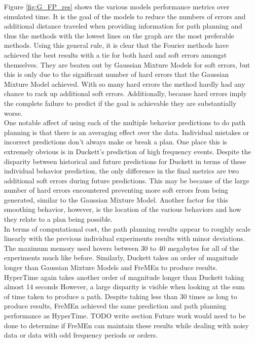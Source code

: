 Figure \ref{fig:G_FP_res} shows the various models performance metrics over
simulated time. It is the goal of the models to reduce the numbers of errors
and additional distance traveled when providing information for path planning
and thus the methods with the lowest lines on the graph are the most
preferable methods. Using this general rule, it is clear that the Fourier
methods have achieved the best results with a tie for both hard and soft errors
amongst themselves. They are beaten out by Gaussian Mixture Models for soft
errors, but this is only due to the significant number of hard errors that
the Gaussian Mixture Model achieved. With so many hard errors the method hardly
had any chance to rack up additional soft errors. Additionally, because hard
errors imply the complete failure to predict if the goal is achievable they
are substantially worse. \\

One notable affect of using each of the multiple behavior predictions to do path
planning is that there is an averaging effect over the data. Individual mistakes
or incorrect predictions don't always make or break a plan. One place this is
extremely obvious is in Duckett's prediction of high frequency events.
Despite the disparity between historical and future predictions for Duckett in
terms of these individual behavior prediction, the only difference in the final
metrics are two additional soft errors during future predictions. This may be
because of the large number of hard errors encountered preventing more
soft errors from being generated, similar to the Gaussian Mixture Model.
Another factor for this smoothing behavior, however, is the location of the
various behaviors and how they relate to a plan being possible. \\

In terms of computational cost, the path planning results appear to roughly
scale linearly with the previous individual experiments results with minor
deviations. The maximum memory used hovers between 30 to 40 megabytes for all
of the experiments much like before. Similarly, Duckett takes an order of
magnitude longer than Gaussian Mixture Models and FreMEn to produce results.
HyperTime again takes another order of magnitude longer than Duckett taking
almost 14 seconds However, a large disparity is visible when looking at the
sum of time taken to produce a path. Despite taking less than 30 times as long
to produce results, FreMEn achieved the same prediction and path planning
performance as HyperTime. TODO write section Future work would need to be done
to determine if FreMEn can maintain these results while dealing with noisy
data or data with odd frequency periods or orders. \\




